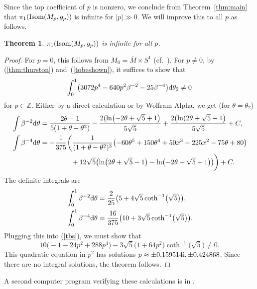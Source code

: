 \documentclass[pdftex]{sigma}
\numberwithin{equation}{section}
\newtheorem{Theorem}{Theorem}[section]
\theoremstyle{definition}
\newcommand{\BbZ}{{\mathbb Z}}
\newcommand{\Z}{\BbZ}
\newcommand{\om}{\overline{M}}
\newcommand{\omz}{M_0}
\newcommand{\omp}{M_p}
\begin{document}
Since the top coefficient of $p$ is nonzero, we conclude from Theorem~\ref{thm:main} that
$\pi_1({\rm Isom}(\omp,g_p))$ is infinite for $|p| \gg 0$. We will improve this to all $p$ as follows.

\begin{Theorem}%
$\pi_1({\rm Isom}(\omp,g_p))$ is infinite for all $p$.
\end{Theorem}

\begin{proof} For $p=0$, this follows from $\omz = \om \times S^1$ (cf.\ \cite[Remark~3.2]{MRT4}).
For $p\neq 0$, by (\ref{thm:thurston}) and~(\ref{tobeshown}), it suffices to show that
\begin{equation}\label{tbs}
 \int_0^1\bigl(3072p^4 -640p^2\beta^{-2} -25\beta^{-4}\bigr){\rm d}\theta_2\neq 0
\end{equation}
for $p\in \Z$. Either by a direct calculation or by Wolfram Alpha, we get (for $\theta= \theta_2$)
\begin{align*}
&\int \beta^{-2}{\rm d}\theta= \frac{2\theta-1}{5(1+\theta-\theta^2)} -
\frac{2(\ln\bigl( -2\theta+ \sqrt{5} + 1\bigr)}{5\sqrt{5}} + \frac{2\bigl(\ln( 2\theta+ \sqrt{5} - 1\bigr)}{5\sqrt{5}} + C, \\
&\int \beta^{-4} {\rm d}\theta=-\frac{1}{375}\biggl( \frac{1}{(1+\theta-\theta^2)^3}\bigl(-60\theta^5+150 \theta^4
+50x^3-225x^2-75\theta+ 80\bigr) \\
&\hphantom{\int \beta^{-4} {\rm d}\theta=-\frac{1}{375}\biggl(}{}
+12\sqrt{5}\bigl(\ln\bigl(2\theta+ \sqrt{5}- 1\bigr)-\ln\bigl(-2\theta+\sqrt{5}+1\bigr)\bigr)
\biggr) +C.
\end{align*}
The definite integrals are
\begin{align*}
&\int_0^1 \beta^{-2}{\rm d}\theta= \frac{2}{25}\bigl( 5+4\sqrt{5}\coth^{-1}\bigl(\sqrt{5}\bigr)\bigr),\\
& \int_0^1 \beta^{-4}{\rm d}\theta=\frac{16}{375}\bigl( 10+3\sqrt{5}\coth^{-1}\bigl(\sqrt{5}\bigr)\bigr).
 \end{align*}
 Plugging this into (\ref{tbs}), we must show that
\[10\bigl(-1 - 24p^2 + 288 p^4\bigr) -3\sqrt{5}\bigl(1+64p^2\bigr) \coth^{-1}\bigl(\sqrt{5}\bigr)\neq 0.\]
This quadratic equation in $p^2$ has solutions $p \approx \pm 0.159514 {\rm i}, \pm 0.424868$. Since there are no integral solutions, the theorem
 follows.
 \end{proof}

 A second computer program verifying these calculations is in \cite{Egi1}.
\end{document}
